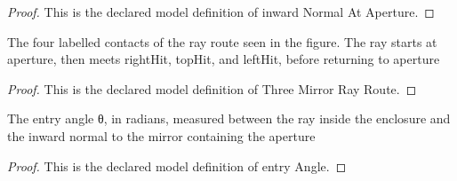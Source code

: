 \begin{proof}
  This is the declared model definition of inward Normal At Aperture.
\end{proof}
\begin{definition}
  \label{def:physics:phyx-mini-0024:phyxminiproblems-problemphyxmini0024-threemirrorrayroute}
  The four labelled contacts of the ray route seen in the figure. The ray starts at aperture, then meets rightHit, topHit, and leftHit, before returning to aperture
\end{definition}
\begin{proof}
  This is the declared model definition of Three Mirror Ray Route.
\end{proof}
\begin{definition}
  \label{def:physics:phyx-mini-0024:phyxminiproblems-problemphyxmini0024-entryangle}
  The entry angle θ, in radians, measured between the ray inside the enclosure and the inward normal to the mirror containing the aperture
\end{definition}
\begin{proof}
  This is the declared model definition of entry Angle.
\end{proof}
